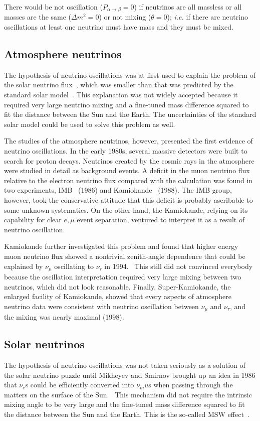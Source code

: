 There would be not oscillation ($P_{\alpha \rightarrow \beta} = 0$) if neutrinos are all massless or all masses are the same ($\Delta m^{2} = 0$) or not mixing ($\theta = 0$); \textit{i.e.} if there are neutrino oscillations at least one neutrino must have mass and they must be mixed.

\subsection{Atmosphere neutrinos}
\label{sec:atmo}
The hypothesis of neutrino oscillations was at first used to explain
the problem of the solar neutrino flux~\cite{Dav64,Dav68}, which was
smaller than that was predicted by the standard solar
model~\cite{Bah98}. This explanation was not widely accepted because
it required very large neutrino mixing and a fine-tuned mass
difference squared to fit the distance between the Sun and the Earth.
The uncertainties of the standard solar model could be used to solve
this problem as well.

The studies of the atmosphere neutrinos, however, presented the first
evidence of neutrino oscillations. In the early 1980s, several massive
detectors were built to search for proton decays. Neutrinos created by
the cosmic rays in the atmosphere were studied in detail as background
events. A deficit in the muon neutrino flux relative to the electron
neutrino flux compared with the calculation was found in two
experiments, IMB~\cite{Hai86} (1986) and Kamiokande~\cite{Hir88}
(1988). The IMB group, however, took the conservative attitude that
this deficit is probably ascribable to some unknown systematics. On
the other hand, the Kamiokande, relying on its capability for clear
$e, \mu$ event separation, ventured to interpret it as a result of
neutrino oscillation.

Kamiokande further investigated this problem and found that higher
energy muon neutrino flux showed a nontrivial zenith-angle dependence
that could be explained by $\nu_\mu$ oscillating to $\nu_\tau$ in
1994.~\cite{Fuk94} This still did not convinced everybody because the
oscillation interpretation required very large mixing between two
neutrinos, which did not look reasonable. Finally, Super-Kamiokande,
the enlarged facility of Kamiokande, showed that every aspects of
atmosphere neutrino data were consistent with neutrino oscillation
between $\nu_\mu$ and $\nu_\tau$, and the mixing was nearly maximal
(1998).~\cite{Fuk98}

\subsection{Solar neutrinos}
\label{sec:solar}
The hypothesis of neutrino oscillations was not taken seriously as a
solution of the solar neutrino puzzle until Mikheyev and Smirnov
brought up an idea in 1986 that $\nu_e$s could be efficiently
converted into $\nu_mu$s when passing through the matters on the
surface of the Sun.~\cite{Mik86} This mechanism did not require the
intrinsic mixing angle to be very large and the fine-tuned mass
difference squared to fit the distance between the Sun and the Earth.
This is the so-called MSW effect~\cite{Mik86,Wol78}.

